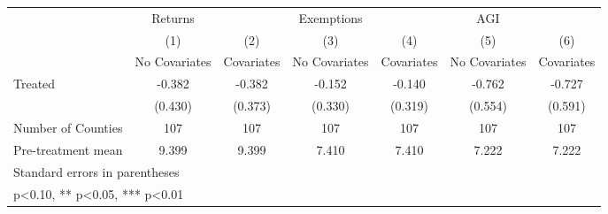 {
\def\sym#1{\ifmmode^{#1}\else\(^{#1}\)\fi}
\begin{tabular}{l*{6}{c}}
\hline\hline
            &     Returns   &               &  Exemptions   &               &         AGI   &               \\
            &\multicolumn{1}{c}{(1)}&\multicolumn{1}{c}{(2)}&\multicolumn{1}{c}{(3)}&\multicolumn{1}{c}{(4)}&\multicolumn{1}{c}{(5)}&\multicolumn{1}{c}{(6)}\\
            &\multicolumn{1}{c}{No Covariates}&\multicolumn{1}{c}{Covariates}&\multicolumn{1}{c}{No Covariates}&\multicolumn{1}{c}{Covariates}&\multicolumn{1}{c}{No Covariates}&\multicolumn{1}{c}{Covariates}\\
\hline
Treated     &      -0.382   &      -0.382   &      -0.152   &      -0.140   &      -0.762   &      -0.727   \\
            &     (0.430)   &     (0.373)   &     (0.330)   &     (0.319)   &     (0.554)   &     (0.591)   \\
\hline
Number of Counties&         107   &         107   &         107   &         107   &         107   &         107   \\
Pre-treatment mean&       9.399   &       9.399   &       7.410   &       7.410   &       7.222   &       7.222   \\
\hline\hline
\multicolumn{7}{l}{\footnotesize Standard errors in parentheses}\\
\multicolumn{7}{l}{\footnotesize * p<0.10, ** p<0.05, *** p<0.01}\\
\end{tabular}
}
